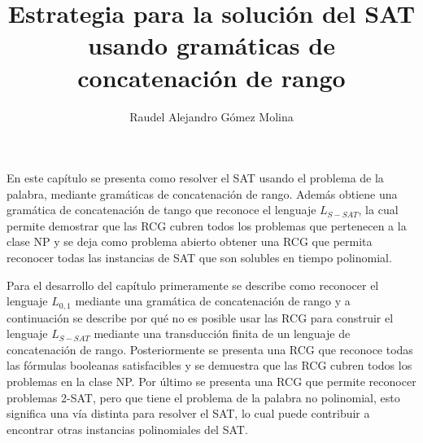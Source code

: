 \documentclass[12pt]{article}
\title{Estrategia para la solución del SAT usando gramáticas de concatenación de rango}
\author{Raudel Alejandro Gómez Molina}
\begin{document}
\maketitle






En este capítulo se presenta como resolver el SAT usando el problema de la palabra, mediante gramáticas de concatenación
de rango. Además obtiene una gramática de concatenación de tango que reconoce el lenguaje $L_{S-SAT}$, la cual permite demostrar
que las RCG cubren todos los problemas que pertenecen a la clase NP y se deja como problema abierto
obtener una RCG que permita reconocer todas las instancias de SAT que son solubles en tiempo polinomial.

Para el desarrollo del capítulo primeramente se describe como reconocer el lenguaje $L_{0,1}$ mediante
una gramática de concatenación de rango y a continuación se describe por qué no es posible usar las RCG
para construir el lenguaje $L_{S-SAT}$ mediante una transducción finita de un lenguaje de concatenación de rango.
Posteriormente se presenta una RCG que reconoce todas las fórmulas booleanas satisfacibles y se demuestra que
las RCG cubren todos los problemas en la clase NP. Por último se presenta una RCG que permite reconocer
problemas 2-SAT, pero que tiene el problema de la palabra no polinomial, esto significa una vía distinta
para resolver el SAT, lo cual puede contribuir a encontrar otras instancias polinomiales del SAT.
\end{document}
